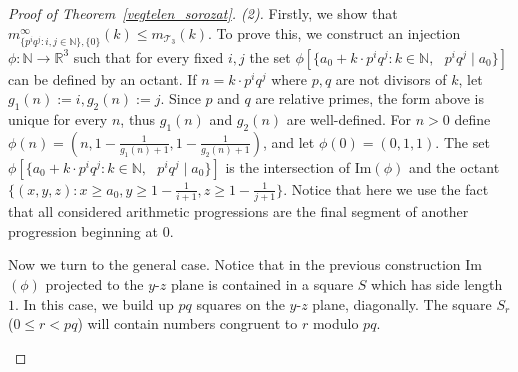 \documentclass[11pt,oneside]{amsart}
\begin{document}
    \begin{proof}[Proof of Theorem~\ref{vegtelen_sorozat}. (2)]
        Firstly, we show that
$m_{\{p^iq^j:i,j \in \mathbb{N}\},\{0\}}^{\infty}(k) \le m_{\mathcal{T}_3}(k)$. To prove this, we construct an injection $\phi:\mathbb{N}\to \mathbb{R}^3$ such that for every fixed $i,j$ the set $\phi[\{a_0+k \cdot p^iq^j: k \in \mathbb{N}, \text{ } p^iq^j\mid a_0\}]$ can be defined by an octant. If $n = k \cdot p^i q^j$ where $p,q$ are not divisors of $k$, let $g_1(n) := i, g_2(n):=j$. Since $p$ and $q$ are relative primes, the form above is unique for every $n$, thus $g_1(n)$ and $g_2(n)$ are well-defined. For $n>0$ define $\phi(n) = (n, 1- \frac{1}{g_1(n)+1}, 1- \frac{1}{g_2(n)+1})$, and let $\phi(0)=(0,1,1)$. The set $\phi[\{a_0+k \cdot p^iq^j: k \in \mathbb{N}, \text{ } p^iq^j\mid a_0\}]$ is the intersection of {\rm Im}$(\phi)$ and the octant  $\{(x,y,z): x \geq a_0, y \geq 1-\frac{1}{i+1}, z \geq 1-\frac{1}{j+1} \}$. Notice that here we use the fact that all considered arithmetic progressions are the final segment of another progression beginning at 0.

Now we turn to the general case. Notice that in the previous construction {\rm Im}$(\phi)$ projected to the $y$-$z$ plane is contained in a square $S$ which has side length $1$. In this case, we build up $pq$ squares on the $y$-$z$ plane, diagonally. The square $S_r$ ($0\leq r < pq$) will contain numbers congruent to $r$ modulo $pq$.  

\begin{figure}[h!]
\begin{center}
    

\begin{tikzpicture}[x=0.75pt,y=0.75pt,yscale=-1,xscale=1]


\end{tikzpicture}
\end{center}
\end{figure}
\end{proof}
\end{document}
